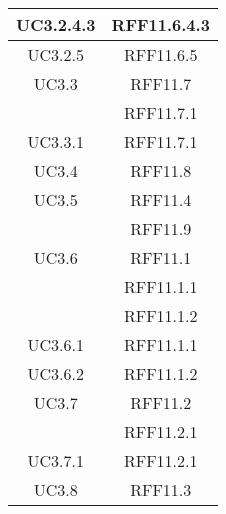 \begin{longtable}{|c|c|}
\midrule
UC3.2.4.3
& RFF11.6.4.3\\

\midrule
UC3.2.5
& RFF11.6.5\\

\midrule
UC3.3
& RFF11.7\\
& RFF11.7.1\\

\midrule
UC3.3.1
& RFF11.7.1\\

\midrule
UC3.4
& RFF11.8\\

\midrule
UC3.5
& RFF11.4\\
& RFF11.9\\

\midrule
UC3.6
& RFF11.1\\
& RFF11.1.1\\
& RFF11.1.2\\

\midrule
UC3.6.1
& RFF11.1.1\\

\midrule
UC3.6.2
& RFF11.1.2\\

\midrule
UC3.7
& RFF11.2\\
& RFF11.2.1\\

\midrule
UC3.7.1
& RFF11.2.1\\

\midrule
UC3.8
& RFF11.3\\

\end{longtable}
